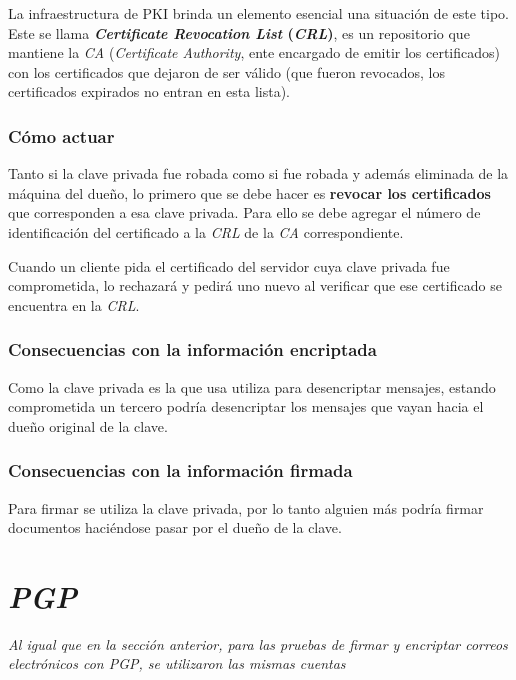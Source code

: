 La infraestructura de PKI brinda un elemento esencial una situación de este tipo. Este se llama \textbf{\emph{Certificate Revocation List} (\emph{CRL})}, es un repositorio que mantiene la \emph{CA} (\emph{Certificate Authority}, ente encargado de emitir los certificados) con los certificados que dejaron de ser válido (que fueron revocados, los certificados expirados no entran en esta lista). 

\subsubsection{Cómo actuar}

Tanto si la clave privada fue robada como si fue robada y además eliminada de la máquina del dueño, lo primero que se debe hacer es \textbf{revocar los certificados} que corresponden a esa clave privada. Para ello se debe agregar el número de identificación del certificado a la \emph{CRL} de la \emph{CA} correspondiente.  

Cuando un cliente pida el certificado del servidor cuya clave privada fue comprometida, lo rechazará y pedirá uno nuevo al verificar que ese certificado se encuentra en la \emph{CRL}. 

\subsubsection{Consecuencias con la información encriptada}

Como la clave privada es la que usa utiliza para desencriptar mensajes, estando comprometida un tercero podría desencriptar los mensajes que vayan hacia el dueño original de la clave.

\subsubsection{Consecuencias con la información firmada}

Para firmar se utiliza la clave privada, por lo tanto alguien más podría firmar documentos haciéndose pasar por el dueño de la clave.


\section{\emph{PGP}}

\emph{Al igual que en la sección anterior, para las pruebas de firmar y encriptar correos electrónicos con PGP, se utilizaron las mismas cuentas} 

\vspace*{5mm}

